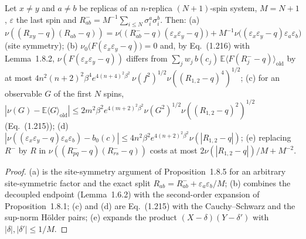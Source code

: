 \begin{theorem}
\label{thm:sg-tal:row-expansion}
  \leanok
{}
Let $x\ne y$ and $a\ne b$ be replicas of an $n$-replica $(N+1)$-spin system, $M=N+1$, $\varepsilon$ the
last spin and $R^-_{ab}=M^{-1}\sum_{i\le N}\sigma^a_i\sigma^b_i$.  Then:
(a) $\nu((R_{xy}-q)(R_{ab}-q))=\nu\bigl((R^-_{ab}-q)(\varepsilon_x\varepsilon_y-q)\bigr)+M^{-1}\nu\bigl((\varepsilon_x\varepsilon_y-q)\varepsilon_a\varepsilon_b\bigr)$ (site symmetry);
(b) $\nu_0\bigl(F(\varepsilon_x\varepsilon_y-q)\bigr)=0$ and, by Eq.~(1.216) with Lemma~1.8.2, $\nu(F(\varepsilon_x\varepsilon_y-q))$ differs from $\sum_j w_j\,b(c_j)\,\mathbb E\langle F(R^-_j-q)\rangle_{\mathrm{old}}$ by at most $4n^2(n+2)^2\beta^4e^{4(n+4)^2\beta^2}\,\nu(f^2)^{1/2}\nu((R_{1,2}-q)^4)^{1/2}$;
(c) for an observable $G$ of the first $N$ spins, $|\nu(G)-\mathbb E\langle G\rangle_{\mathrm{old}}|\le 2m^2\beta^2e^{4(m+2)^2\beta^2}\nu(G^2)^{1/2}\nu((R_{1,2}-q)^2)^{1/2}$ (Eq.~(1.215));
(d) $|\nu((\varepsilon_x\varepsilon_y-q)\varepsilon_a\varepsilon_b)-b_0(c)|\le 4n^2\beta^2e^{4(n+2)^2\beta^2}\nu(|R_{1,2}-q|)$;
(e) replacing $R^-$ by $R$ in $\nu((R^-_{pq}-q)(R^-_{rs}-q))$ costs at most $2\nu(|R_{1,2}-q|)/M+M^{-2}$.
\end{theorem}
\begin{proof}
  \leanok
(a) is the site-symmetry argument of Proposition~1.8.5 for an arbitrary site-symmetric factor and the exact split $R_{ab}=R^-_{ab}+\varepsilon_a\varepsilon_b/M$; (b) combines the decoupled endpoint (Lemma~1.6.2) with the second-order expansion of Proposition~1.8.1; (c) and (d) are Eq.~(1.215) with the Cauchy--Schwarz and the sup-norm H\"older pairs; (e) expands the product $(X-\delta)(Y-\delta')$ with $|\delta|,|\delta'|\le 1/M$.
\end{proof}

